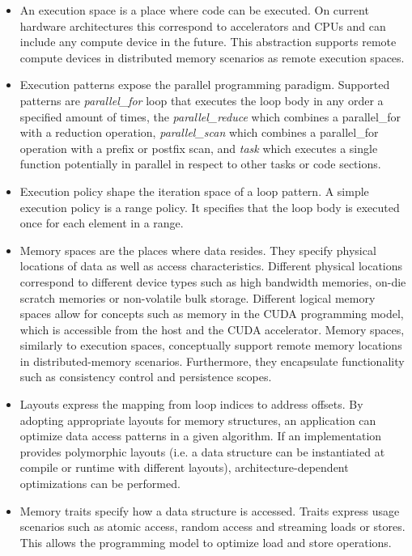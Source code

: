 \begin{itemize}
	\item  An execution space is a place where code can be executed. On current hardware architectures this correspond to accelerators and CPUs and can include any compute device in the future. This abstraction supports remote compute devices in distributed memory scenarios as remote execution spaces.
	\item Execution patterns expose the parallel programming paradigm. Supported patterns are \emph{parallel\_for} loop that executes the loop body in any order a specified amount of times, the \emph{parallel\_reduce} which combines a parallel\_for with a reduction operation, \emph{parallel\_scan} which combines a parallel\_for operation with a prefix or postfix scan, and \emph{task} which executes a single function potentially in parallel in respect to other tasks or code sections. 
	\item Execution policy shape the iteration space of a loop pattern. A simple execution policy is a range policy. It specifies that the loop body is executed once for each element in a range.
	\item Memory spaces are the places where data resides. They specify physical locations of data as well as access characteristics. Different physical locations correspond to different device types such as high bandwidth memories, on-die scratch memories or non-volatile bulk storage. Different logical memory spaces allow for concepts such as memory in the CUDA programming model, which is accessible from the host and the CUDA accelerator. Memory spaces, similarly to execution spaces, conceptually support remote memory locations in distributed-memory scenarios. Furthermore, they encapsulate functionality such as consistency control and persistence scopes.
	\item Layouts express the mapping from loop indices to address offsets. By adopting appropriate layouts for memory structures, an application can optimize data access patterns in a given algorithm. If an implementation provides polymorphic layouts (i.e. a data structure can be instantiated at compile or runtime with different layouts), architecture-dependent optimizations can be performed.
	\item Memory traits specify how a data structure is accessed. Traits express usage scenarios such as atomic access, random access and streaming loads or stores. This allows the programming model to  optimize load and store operations.
\end{itemize}

